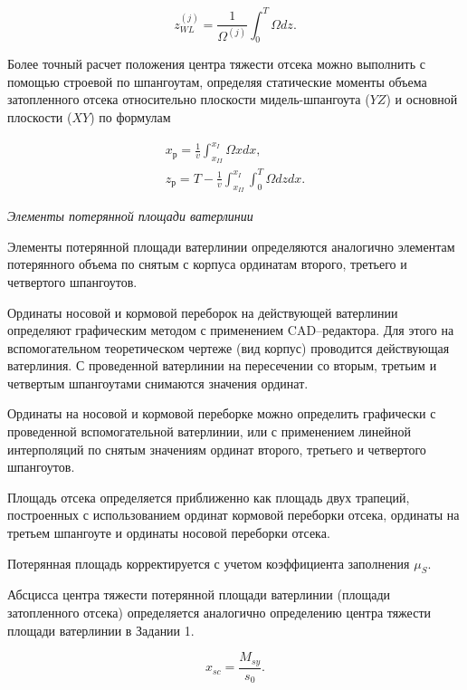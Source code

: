 \begin{equation}
    z_{WL}^{(j)} = \frac{1}{\Omega^{(j)}} \int_0^T \Omega dz.
\end{equation}

Более точный расчет положения центра тяжести отсека можно выполнить с помощью строевой по шпангоутам, определяя статические моменты объема затопленного отсека относительно плоскости мидель-шпангоута ($YZ$) и основной плоскости ($XY$) по формулам

\begin{equation}
    \begin{split}
        x_{\text{р}} = \frac{1}{v} \int_{x_{II}}^{x_{I}} \Omega x dx, \\
        z_{\text{р}} = T - \frac{1}{v} \int_{x_{II}}^{x_{I}} \int_0^T \Omega dz dx.
    \end{split}
\end{equation}


\textit{Элементы потерянной площади ватерлинии}

Элементы потерянной площади ватерлинии определяются аналогично элементам потерянного объема по снятым с корпуса ординатам второго, третьего и четвертого шпангоутов.

Ординаты носовой и кормовой переборок на действующей ватерлинии определяют графическим методом с применением CAD–редактора.
Для этого на вспомогательном теоретическом чертеже (вид корпус) проводится действующая ватерлиния.
С проведенной ватерлинии на пересечении со вторым, третьим и четвертым шпангоутами снимаются значения ординат.

Ординаты на носовой и кормовой переборке можно определить графически с проведенной вспомогательной ватерлинии, или с применением линейной интерполяций по снятым значениям ординат второго, третьего и четвертого шпангоутов.

Площадь отсека определяется приближенно как площадь двух трапеций, построенных с использованием ординат кормовой переборки отсека, ординаты на третьем шпангоуте и ординаты носовой переборки отсека.


Потерянная площадь корректируется с учетом коэффициента заполнения $\mu_{S}$.

Абсцисса центра тяжести потерянной площади ватерлинии (площади затопленного отсека) определяется аналогично определению центра тяжести площади ватерлинии в Задании 1.

\begin{equation}
    x_{sc} = \frac{M_{sy}}{s_0}.
\end{equation}


